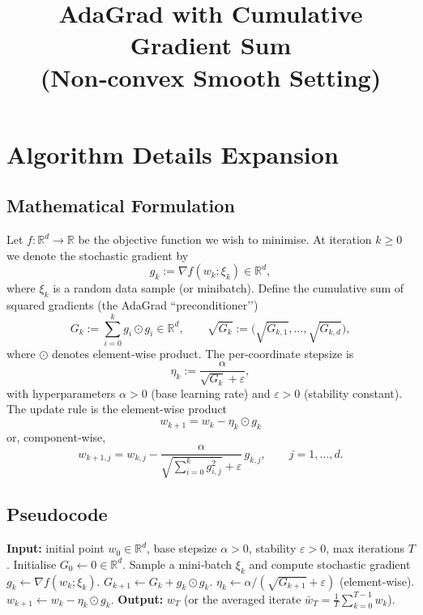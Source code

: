 \documentclass{article}
\newcommand{\R}{\mathbb{R}}
\begin{document}
\title{AdaGrad with Cumulative Gradient Sum \\ (Non‑convex Smooth Setting)}
\author{}
\date{}
\maketitle

\section*{Algorithm Details Expansion}

\subsection*{Mathematical Formulation}
Let $f:\R^{d}\rightarrow\R$ be the objective function we wish to minimise.
At iteration $k\ge 0$ we denote the stochastic gradient by 
\[
g_{k}:=\nabla f(w_{k};\xi_{k})\in\R^{d},
\]
where $\xi_{k}$ is a random data sample (or minibatch).  
Define the cumulative sum of squared gradients (the AdaGrad “preconditioner’’)
\[
G_{k}:=\sum_{i=0}^{k} g_{i}\odot g_{i}\in\R^{d},
\qquad 
\sqrt{G_{k}}:=\bigl(\sqrt{G_{k,1}},\ldots,\sqrt{G_{k,d}}\bigr),
\]
where $\odot$ denotes element‑wise product.  
The per‑coordinate stepsize is
\[
\eta_{k}:=\frac{\alpha}{\sqrt{G_{k}}+\varepsilon},
\]
with hyperparameters $\alpha>0$ (base learning rate) and $\varepsilon>0$ (stability
constant).  The update rule is the element‑wise product
\[
\boxed{ \; w_{k+1}= w_{k}-\eta_{k}\odot g_{k}\; }                \tag{1}
\]
or, component‑wise,
\[
w_{k+1,j}=w_{k,j}-\frac{\alpha}{\sqrt{\sum_{i=0}^{k} g_{i,j}^{2}}+\varepsilon}\,
g_{k,j},\qquad j=1,\dots ,d .
\]

\subsection*{Pseudocode}
\begin{algorithm}[H]
\caption{AdaGrad with Cumulative Gradient Sum}
\begin{algorithmic}[1]
\STATE \textbf{Input:} initial point $w_{0}\in\R^{d}$, base stepsize $\alpha>0$, 
stability $\varepsilon>0$, max iterations $T$.
\STATE Initialise $G_{0}\gets 0\in\R^{d}$.
    \STATE Sample a mini‑batch $\xi_{k}$ and compute stochastic gradient $g_{k}
          \gets \nabla f(w_{k};\xi_{k})$.
    \STATE $G_{k+1}\gets G_{k}+g_{k}\odot g_{k}$.
    \STATE $\eta_{k}\gets \alpha/(\sqrt{G_{k+1}}+\varepsilon)$ (element‑wise).
    \STATE $w_{k+1}\gets w_{k}-\eta_{k}\odot g_{k}$.
\ENDFOR
\STATE \textbf{Output:} $w_{T}$ (or the averaged iterate $\bar w_{T}
      =\frac{1}{T}\sum_{k=0}^{T-1}w_{k}$).
\end{algorithmic}
\end{algorithm}
\end{document}
